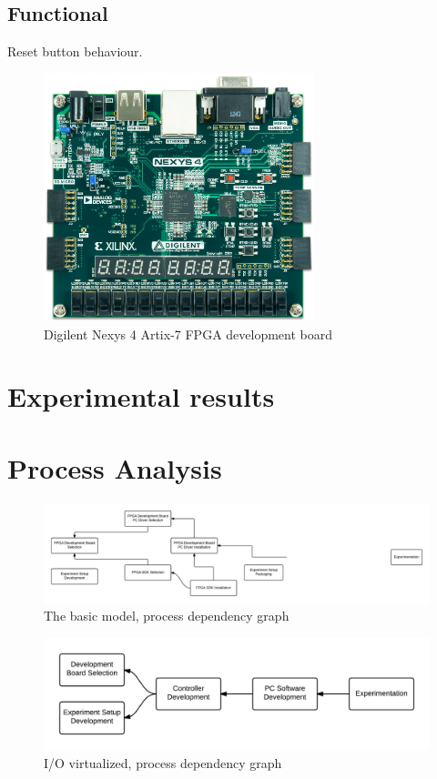 \documentclass[openright]{template/uva-bachelor-thesis}
\begin{document}
\section{Functional}
Reset button behaviour.

\begin{figure}
\centering
\includegraphics[width=0.7\textwidth]{img/nexys4-small}
\caption{Digilent Nexys 4 Artix-7 FPGA development board}
\label{fig:nexys4}
\end{figure}

\chapter{Experimental results}

\appendix

\chapter{Process Analysis}

\begin{figure}[h]
\centering
\includegraphics[width=\textwidth]{img/processes-dependencies-basic}
\caption{The basic model, process dependency graph}
\label{fig:dependencies-basic}
\end{figure}

\begin{figure}[h]
\centering
\includegraphics[width=\textwidth]{img/processes-dependencies-inout}
\caption{I/O virtualized, process dependency graph}
\label{fig:dependencies-inout}
\end{figure}
\end{document}
